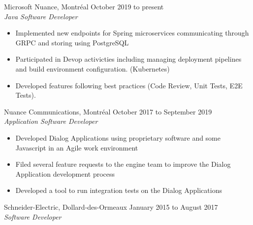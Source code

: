\documentclass{res}
\newcommand{\inEnglish}[1]{#1}
\begin{document}
\begin{resume}
%
%	

\inEnglish{
	Microsoft Nuance, Montréal
	\hfill October 2019 to present \\
	{\sl Java Software Developer}
	\vspace{0.05in}

	\begin{itemize} \itemsep -2pt
		\item Implemented new endpoints for Spring microservices communicating through GRPC and storing using PostgreSQL
		\item Participated in Devop activicties including managing deployment pipelines and build environment configuration. (Kubernetes)
	           \item Developed features following best practices (Code Review, Unit Tests, E2E Tests).
	\end{itemize}

	Nuance Communications, Montréal
	\hfill October 2017 to September 2019 \\
	{\sl Application Software Developer}
	\vspace{0.05in}

	\begin{itemize} \itemsep -2pt
		\item Developed Dialog Applications using proprietary software and some Javascript in an Agile work environment
		\item Filed several feature requests to the engine team to improve the Dialog Application development process
		\item Developed a tool to run integration tests on the Dialog Applications
	\end{itemize}

	Schneider-Electric, Dollard-des-Ormeaux
	\hfill January 2015 to August 2017 \\
	{\sl Software Developer}
	\vspace{0.05in}

}
\end{resume}
\end{document}
